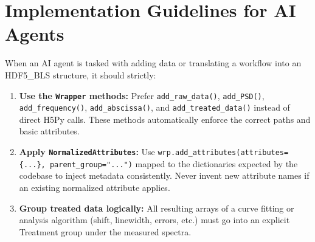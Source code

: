 \documentclass{article}
\begin{document}
\section{Implementation Guidelines for AI Agents}
When an AI agent is tasked with adding data or translating a workflow into an HDF5\_BLS structure, it should strictly:
\begin{enumerate}
    \item \textbf{Use the \texttt{Wrapper} methods:} Prefer \texttt{add\_raw\_data()}, \texttt{add\_PSD()}, \texttt{add\_frequency()}, \texttt{add\_abscissa()}, and \texttt{add\_treated\_data()} instead of direct H5Py calls. These methods automatically enforce the correct paths and basic attributes.
    \item \textbf{Apply \texttt{NormalizedAttributes}:} Use \texttt{wrp.add\_attributes(attributes=\{...\}, parent\_group="...")} mapped to the dictionaries expected by the codebase to inject metadata consistently. Never invent new attribute names if an existing normalized attribute applies.
    \item \textbf{Group treated data logically:} All resulting arrays of a curve fitting or analysis algorithm (shift, linewidth, errors, etc.) must go into an explicit Treatment group under the measured spectra.
\end{enumerate}
\end{document}
